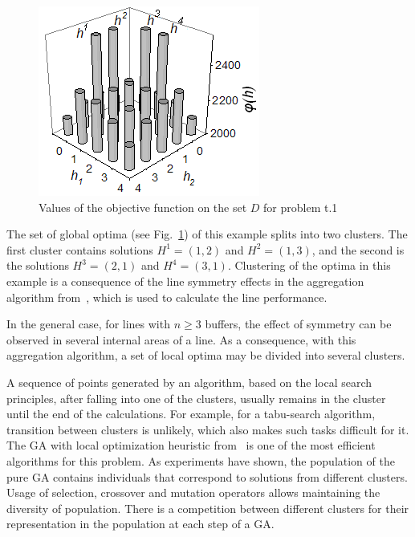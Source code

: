 \documentclass{ifacconf}
\begin{document}
 \begin{figure}[h!]
	\centering
	\includegraphics[scale=0.7]{test}
  \caption{Values of the objective function on the set $D$ for problem t.1\label{t_1}}
  \end{figure}

The set of global optima (see Fig.~\ref{t_1}) of this example splits into two clusters. The
first cluster contains solutions $H^1=(1,2)$ and $H^2=(1,3)$, and
the second is the solutions $H^3=(2,1)$ and $H^4=(3,1)$. Clustering of the optima in
this example is a consequence of the line symmetry effects
in the aggregation algorithm from~\cite{Dolgui93, DF}, which is used to calculate the line performance.

In the general case, for lines with $n\geq 3$ buffers, the effect of
symmetry can be observed in several internal areas of a
line. As a consequence, with this aggregation algorithm, a
set of local optima may be divided into several clusters.

A sequence of points generated by an algorithm, based on the local search principles, after falling into one of the clusters, usually
 remains in the cluster until the end of the calculations. For example, for a tabu-search algorithm, transition between clusters is unlikely, which also makes
such tasks difficult for it. 
The GA with local optimization heuristic from~\cite{sHBBA2007} is one of the most efficient algorithms for this problem. 
As experiments have shown, the population of the pure GA contains individuals that correspond to solutions from different clusters. 
Usage of selection, crossover and mutation operators allows maintaining the diversity of population.
There is a competition between different clusters for their representation in the population at each step of a GA.
\end{document}
